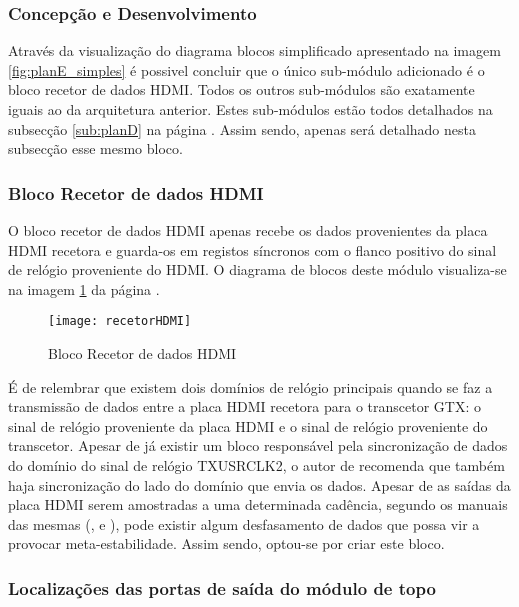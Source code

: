 \subsubsection{Concepção e Desenvolvimento}

Através da visualização do diagrama blocos simplificado apresentado na imagem \ref{fig:planE_simples} é possivel concluir que o único sub-módulo adicionado é o bloco recetor de dados HDMI. Todos os outros sub-módulos são exatamente iguais ao da arquitetura anterior. Estes sub-módulos estão todos detalhados na subsecção \ref{sub:planD} na página \pageref{sub:planD}. Assim sendo, apenas será detalhado nesta subsecção esse mesmo bloco.

\subsubsection*{Bloco Recetor de dados HDMI}
O bloco recetor de dados HDMI apenas recebe os dados provenientes da placa HDMI recetora e guarda-os em registos síncronos com o flanco positivo do sinal de relógio proveniente do HDMI. O diagrama de blocos deste módulo visualiza-se na imagem \ref{fig:recetorHDMI} da página \pageref{fig:recetorHDMI}.
\begin{figure}[h!]
	\begin{center}
		\leavevmode
		\texttt{[image: recetorHDMI]}
		\captionsetup{width=1.0\linewidth}
		\caption[Bloco recetor de dados HDMI]{Bloco Recetor de dados HDMI}
		\label{fig:recetorHDMI}
	\end{center}
\end{figure}

É de relembrar que existem dois domínios de relógio principais quando se faz a transmissão de dados entre a placa HDMI recetora para o transcetor GTX: o sinal de relógio proveniente da placa HDMI e o sinal de relógio proveniente do transcetor. Apesar de já existir um bloco responsável pela sincronização de dados do domínio do sinal de relógio TXUSRCLK2, o autor de \cite{R024} recomenda que também haja sincronização do lado do domínio que envia os dados. Apesar de as saídas da placa HDMI serem amostradas a uma determinada cadência, segundo os manuais das mesmas (\cite{R009}, \cite{R014} e \cite{R013}), pode existir algum desfasamento de dados que possa vir a provocar meta-estabilidade. Assim sendo, optou-se por criar este bloco.

\subsubsection*{Localizações das portas de saída do módulo de topo} \label{subsub:serial_locs_planE}


